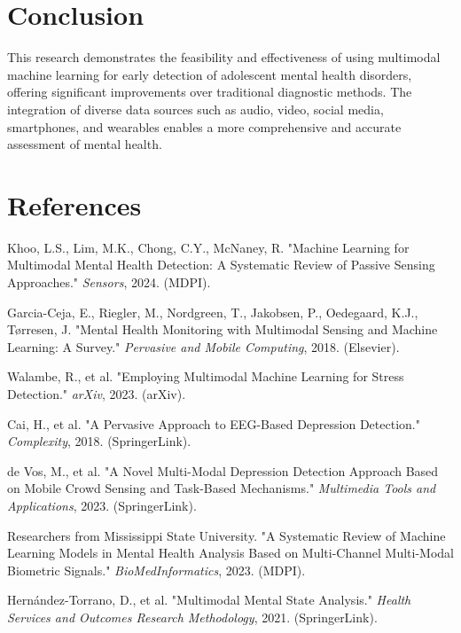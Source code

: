 \documentclass{article}
\begin{document}
\section{Conclusion}
This research demonstrates the feasibility and effectiveness of using multimodal machine learning for early detection of adolescent mental health disorders, offering significant improvements over traditional diagnostic methods. The integration of diverse data sources such as audio, video, social media, smartphones, and wearables enables a more comprehensive and accurate assessment of mental health.

\section{References}

\begin{enumerate}[label={[\arabic*]}, leftmargin=*]
    \item \label{ref:khoo} Khoo, L.S., Lim, M.K., Chong, C.Y., McNaney, R. "Machine Learning for Multimodal Mental Health Detection: A Systematic Review of Passive Sensing Approaches." \emph{Sensors}, 2024. (MDPI).
    \item \label{ref:garcia} Garcia-Ceja, E., Riegler, M., Nordgreen, T., Jakobsen, P., Oedegaard, K.J., Tørresen, J. "Mental Health Monitoring with Multimodal Sensing and Machine Learning: A Survey." \emph{Pervasive and Mobile Computing}, 2018. (Elsevier).
    \item \label{ref:walambe} Walambe, R., et al. "Employing Multimodal Machine Learning for Stress Detection." \emph{arXiv}, 2023. (arXiv).
    \item \label{ref:cai} Cai, H., et al. "A Pervasive Approach to EEG-Based Depression Detection." \emph{Complexity}, 2018. (SpringerLink).
    \item \label{ref:de} de Vos, M., et al. "A Novel Multi-Modal Depression Detection Approach Based on Mobile Crowd Sensing and Task-Based Mechanisms." \emph{Multimedia Tools and Applications}, 2023. (SpringerLink).
    \item \label{ref:researchers} Researchers from Mississippi State University. "A Systematic Review of Machine Learning Models in Mental Health Analysis Based on Multi-Channel Multi-Modal Biometric Signals." \emph{BioMedInformatics}, 2023. (MDPI).
    \item \label{ref:hernandez} Hernández-Torrano, D., et al. "Multimodal Mental State Analysis." \emph{Health Services and Outcomes Research Methodology}, 2021. (SpringerLink).

\end{enumerate}
\end{document}
